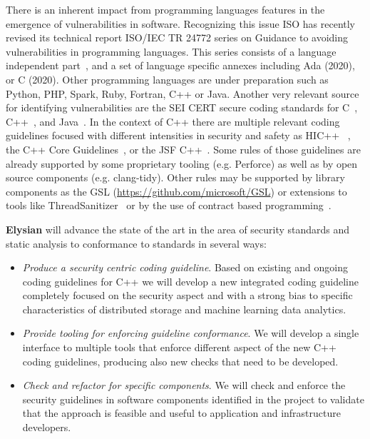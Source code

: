 \documentclass[a4paper,11pt]{article}
\newcommand{\project}[1]{\textbf{#1}\xspace}
\newcommand{\SECURITY}{\project{Elysian}}
\newcommand{\TheProject}{\SECURITY}
\begin{document}
There is an inherent impact from programming languages features in the
emergence of vulnerabilities in software. Recognizing this issue ISO has
recently revised its technical report ISO/IEC  TR 24772 series on Guidance to
avoiding vulnerabilities in programming languages. This series consists of a
language independent part~\cite{iso24772:1}, and a set of language specific
annexes including Ada (2020), or C (2020). Other programming languages are
under preparation such as Python, PHP, Spark, Ruby, Fortran, C++ or Java.
Another very relevant source for identifying vulnerabilities are the SEI CERT
secure coding standards for C~\cite{cert:c}, C++~\cite{cert:cpp}, and
Java~\cite{cert:java}. In the context of C++ there are multiple relevant coding
guidelines focused with different intensities in security and safety as
HIC++~\cite{hicpp} , the C++ Core Guidelines~\cite{cpp:core-guidelines}, or the
JSF C++~\cite{cpp:jsf}. Some rules of those guidelines are already supported by
some proprietary tooling (e.g.  Perforce) as well as by open source components
(e.g.  clang-tidy).  Other rules may be supported by library components as the
GSL (\url{https://github.com/microsoft/GSL}) or extensions to tools like 
ThreadSanitizer~\cite{dolz:2017}
or by the use of contract based programming~\cite{lopez-gomez:2019}.

\begin{mdframed}[backgroundcolor=gray!10]
\TheProject{} will advance the state of the art in the area of security standards and static analysis to conformance to standards in several ways:
\begin{itemize}
\item \emph{Produce a security centric coding guideline}. 
Based on existing and ongoing coding guidelines for C++ we will develop a new
integrated coding guideline completely focused on the security aspect and with
a strong bias to specific characteristics of distributed storage and machine
learning data analytics.

\item \emph{Provide tooling for enforcing guideline conformance}. 
We will develop a single interface to multiple tools that enforce different aspect
of the new C++ coding guidelines, producing also new checks that need to be developed.

\item \emph{Check and refactor for specific components}. 
We will check and enforce the security guidelines in software components identified
in the project to validate that the approach is feasible and useful to
application and infrastructure developers. 

\end{itemize}
\end{mdframed}
\end{document}
